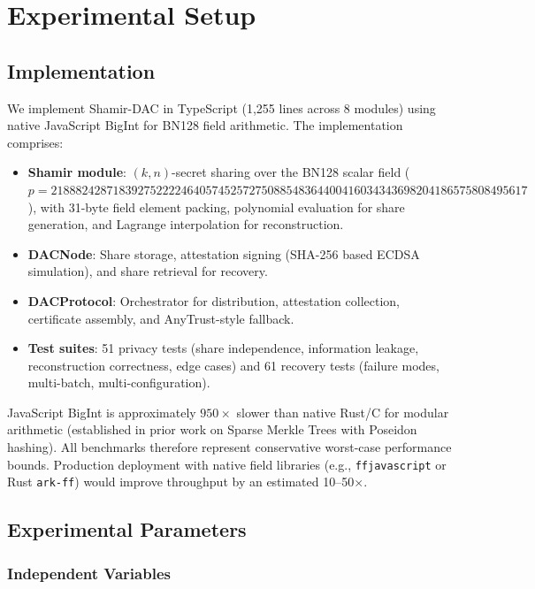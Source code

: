 
\section{Experimental Setup}

\subsection{Implementation}

We implement Shamir-DAC in TypeScript (1,255 lines across 8 modules) using
native JavaScript BigInt for BN128 field arithmetic. The implementation
comprises:

\begin{itemize}
\item \textbf{Shamir module}: $(k,n)$-secret sharing over the BN128 scalar
  field ($p = 21888242871839275222246405745257275088548364400416034343698204186575808495617$),
  with 31-byte field element packing, polynomial evaluation for share
  generation, and Lagrange interpolation for reconstruction.
\item \textbf{DACNode}: Share storage, attestation signing (SHA-256 based
  ECDSA simulation), and share retrieval for recovery.
\item \textbf{DACProtocol}: Orchestrator for distribution, attestation
  collection, certificate assembly, and AnyTrust-style fallback.
\item \textbf{Test suites}: 51 privacy tests (share independence,
  information leakage, reconstruction correctness, edge cases) and 61
  recovery tests (failure modes, multi-batch, multi-configuration).
\end{itemize}

JavaScript BigInt is approximately $950\times$ slower than native Rust/C
for modular arithmetic (established in prior work on Sparse Merkle Trees
with Poseidon hashing). All benchmarks therefore represent conservative
worst-case performance bounds. Production deployment with native field
libraries (e.g., \texttt{ffjavascript} or Rust \texttt{ark-ff}) would
improve throughput by an estimated 10--50$\times$.

\subsection{Experimental Parameters}

\subsubsection{Independent Variables}

